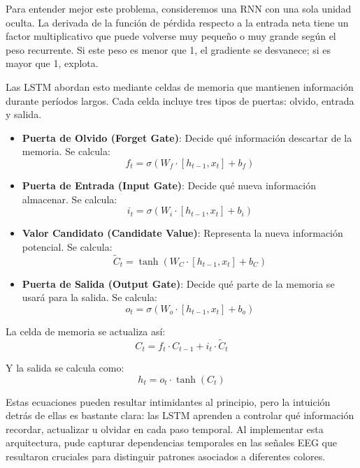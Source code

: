 Para entender mejor este problema, consideremos una RNN con una sola unidad oculta. La derivada de la función de pérdida respecto a la entrada neta tiene un factor multiplicativo que puede volverse muy pequeño o muy grande según el peso recurrente. Si este peso es menor que 1, el gradiente se desvanece; si es mayor que 1, explota.

Las LSTM abordan esto mediante celdas de memoria que mantienen información durante períodos largos. Cada celda incluye tres tipos de puertas: olvido, entrada y salida.

\begin{itemize}
    \item \textbf{Puerta de Olvido (Forget Gate)}: Decide qué información descartar de la memoria. Se calcula:
    \begin{equation}
        f_t = \sigma(W_f \cdot [h_{t-1}, x_t] + b_f)
    \end{equation}
    \item \textbf{Puerta de Entrada (Input Gate)}: Decide qué nueva información almacenar. Se calcula:
    \begin{equation}
        i_t = \sigma(W_i \cdot [h_{t-1}, x_t] + b_i)
    \end{equation}
    \item \textbf{Valor Candidato (Candidate Value)}: Representa la nueva información potencial. Se calcula:
    \begin{equation}
        \tilde{C}_t = \tanh(W_C \cdot [h_{t-1}, x_t] + b_C)
    \end{equation}
    \item \textbf{Puerta de Salida (Output Gate)}: Decide qué parte de la memoria se usará para la salida. Se calcula:
    \begin{equation}
        o_t = \sigma(W_o \cdot [h_{t-1}, x_t] + b_o)
    \end{equation}
\end{itemize}

La celda de memoria se actualiza así:
\begin{equation}
    C_t = f_t \cdot C_{t-1} + i_t \cdot \tilde{C}_t
\end{equation}

Y la salida se calcula como:
\begin{equation}
    h_t = o_t \cdot \tanh(C_t)
\end{equation}

Estas ecuaciones pueden resultar intimidantes al principio, pero la intuición detrás de ellas es bastante clara: las LSTM aprenden a controlar qué información recordar, actualizar u olvidar en cada paso temporal. Al implementar esta arquitectura, pude capturar dependencias temporales en las señales EEG que resultaron cruciales para distinguir patrones asociados a diferentes colores.

